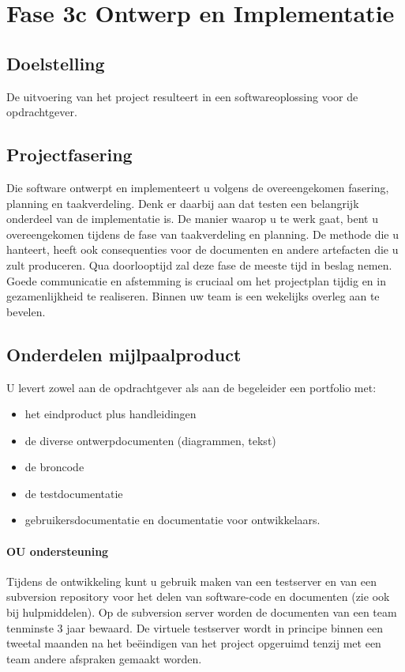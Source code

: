 \section{Fase 3c Ontwerp en Implementatie}
\subsection{Doelstelling}
De uitvoering van het project resulteert in een softwareoplossing
voor de opdrachtgever.

\subsection{Projectfasering}Die software ontwerpt en implementeert u volgens de
overeengekomen fasering, planning en taakverdeling. Denk er daarbij aan dat
testen een belangrijk onderdeel van de implementatie is. De manier waarop u
te werk gaat, bent u overeengekomen tijdens de fase van
taakverdeling en planning. De methode die u hanteert, heeft ook consequenties
voor de documenten en andere artefacten die u zult produceren. Qua doorlooptijd
zal deze fase de meeste tijd in beslag nemen. Goede
communicatie en afstemming is cruciaal om het projectplan tijdig en in
gezamenlijkheid te realiseren. Binnen uw team is een wekelijks overleg aan
te bevelen.
\subsection{Onderdelen mijlpaalproduct}
    U levert zowel aan de opdrachtgever als aan de begeleider een portfolio met:

    \begin{itemize}
	\item het eindproduct plus handleidingen
	\item de diverse ontwerpdocumenten (diagrammen, tekst)
	\item de broncode
	\item de testdocumentatie
	\item gebruikersdocumentatie en documentatie voor ontwikkelaars.
    \end{itemize}

\paragraph{OU ondersteuning} Tijdens de ontwikkeling kunt u gebruik maken van
een testserver en van een subversion repository voor het delen van software-code
en documenten (zie ook bij hulpmiddelen).  Op de subversion server worden de
documenten van een team tenminste 3 jaar bewaard. De virtuele testserver
wordt in principe binnen een tweetal maanden na het beëindigen van het project
opgeruimd tenzij met een team andere afspraken gemaakt worden.

